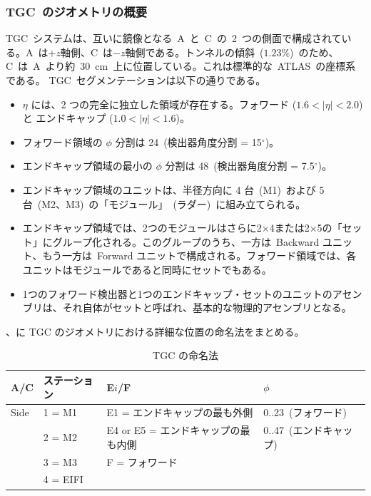 \subsubsection{TGC~のジオメトリの概要}
TGC~システムは、互いに鏡像となる~A~と~C~の~2~つの側面で構成されている。A~は$+z$軸側、C~は$-z$軸側である。トンネルの傾斜~($1.23\%$)~のため、C~は~A~より約~30~cm~上に位置している。これは標準的な~ATLAS~の座標系である。
TGC~セグメンテーションは以下の通りである。
\begin{itemize}
    \item $\eta$ には、2 つの完全に独立した領域が存在する。フォワード ($1.6<|\eta|<2.0$) と エンドキャップ ($1.0<|\eta|<1.6$)。
    \item フォワード領域の $\phi$ 分割は 24~(検出器角度分割 = 15$^{\circ}$)。
    \item エンドキャップ領域の最小の $\phi$ 分割は 48~(検出器角度分割 = 7.5$^{\circ}$)。
    \item エンドキャップ領域のユニットは、半径方向に 4 台~(M1)~および 5 台~(M2、M3)~の「モジュール」~(ラダー)~に組み立てられる。
    \item エンドキャップ領域では、2つのモジュールはさらに2×4または2×5の「セット」にグループ化される。このグループのうち、一方は~Backward ユニット、もう一方は~Forward ユニットで構成される。フォワード領域では、各ユニットはモジュールであると同時にセットでもある。
    \item 1つのフォワード検出器と1つのエンドキャップ・セットのユニットのアセンブリは、それ自体がセットと呼ばれ、基本的な物理的アセンブリとなる。
\end{itemize}
、に TGC のジオメトリにおける詳細な位置の命名法をまとめる。

\begin{table}[tb]
	\centering
	\begin{tabular}{llll}\hline
	A/C & ステーション & E$i$/F & $\phi$ \\ \hline
	Side & 1 = M1  & E1 = エンドキャップの最も外側 & 0..23~(フォワード)~\\
	& 2 = M2 & E4 or E5 = エンドキャップの最も内側 & 0..47~(エンドキャップ)~\\
	& 3 = M3 & F = フォワード & \\
	& 4 = EIFI && \\ \hline
	\end{tabular}
	\caption{TGC の命名法}
	\label{tb:tgcNaming}
\end{table}

